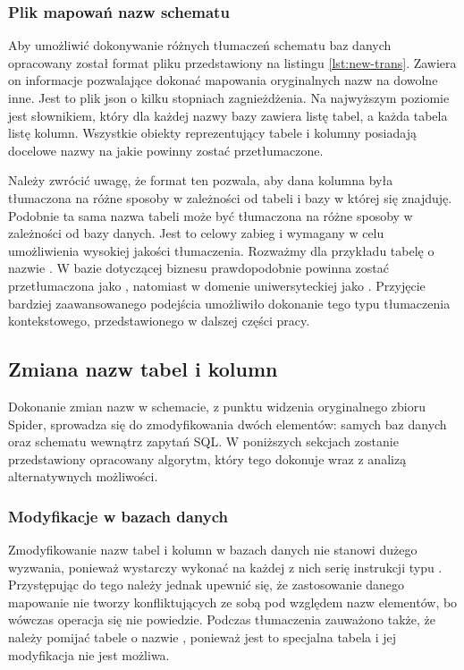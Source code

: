 \subsubsection{Plik mapowań nazw schematu}
Aby umożliwić dokonywanie różnych tłumaczeń schematu baz danych opracowany został format pliku przedstawiony na listingu \ref{lst:new-trans}. Zawiera on informacje pozwalające dokonać mapowania oryginalnych nazw na dowolne inne. Jest to plik json o kilku stopniach zagnieżdżenia. Na najwyższym poziomie jest słownikiem, który dla każdej nazwy bazy zawiera listę tabel, a każda tabela listę kolumn. Wszystkie obiekty reprezentujący tabele i kolumny posiadają docelowe nazwy na jakie powinny zostać przetłumaczone.

\begin{minipage}{\linewidth}

\end{minipage}

Należy zwrócić uwagę, że format ten pozwala, aby dana kolumna była tłumaczona na różne sposoby w zależności od tabeli i bazy w której się znajduję. Podobnie ta sama nazwa tabeli może być tłumaczona na różne sposoby w zależności od bazy danych. Jest to celowy zabieg i wymagany w celu umożliwienia wysokiej jakości tłumaczenia. Rozważmy dla przykładu tabelę o nazwie . W bazie dotyczącej biznesu prawdopodobnie powinna zostać przetłumaczona jako , natomiast w domenie uniwersyteckiej jako . Przyjęcie bardziej zaawansowanego podejścia umożliwiło dokonanie tego typu tłumaczenia kontekstowego, przedstawionego w dalszej części pracy.

\subsection{Zmiana nazw tabel i kolumn}
Dokonanie zmian nazw w schemacie, z punktu widzenia oryginalnego zbioru Spider, sprowadza się do zmodyfikowania dwóch elementów: samych baz danych oraz schematu wewnątrz zapytań SQL. W poniższych sekcjach zostanie przedstawiony opracowany algorytm, który tego dokonuje wraz z analizą alternatywnych możliwości. 

\subsubsection{Modyfikacje w bazach danych}
Zmodyfikowanie nazw tabel i kolumn w bazach danych nie stanowi dużego wyzwania, ponieważ wystarczy wykonać na każdej z nich serię instrukcji typu . Przystępując do tego należy jednak upewnić się, że zastosowanie danego mapowanie nie tworzy konfliktujących ze sobą pod względem nazw elementów, bo wówczas operacja się nie powiedzie. Podczas tłumaczenia zauważono także, że należy pomijać tabele o nazwie , ponieważ jest to specjalna tabela i jej modyfikacja nie jest możliwa.

